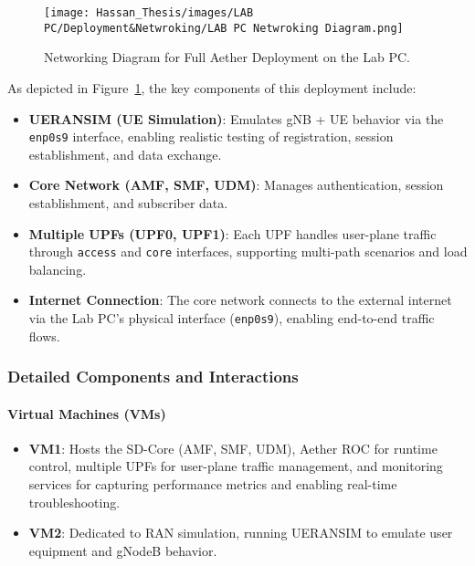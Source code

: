 \begin{figure}[!htb]
    \centering
    \texttt{[image: Hassan\_Thesis/images/LAB PC/Deployment\&Netwroking/LAB PC Netwroking Diagram.png]}
    \caption{Networking Diagram for Full Aether Deployment on the Lab PC.}
    \label{fig:lab-pc-network}
\end{figure}

As depicted in Figure~\ref{fig:lab-pc-network}, the key components of this deployment include:
\begin{itemize}
    \item \textbf{UERANSIM (UE Simulation)}: Emulates gNB + UE behavior via the \texttt{enp0s9} interface, enabling realistic testing of registration, session establishment, and data exchange.
    \item \textbf{Core Network (AMF, SMF, UDM)}: Manages authentication, session establishment, and subscriber data.
    \item \textbf{Multiple UPFs (UPF0, UPF1)}: Each UPF handles user-plane traffic through \texttt{access} and \texttt{core} interfaces, supporting multi-path scenarios and load balancing.
    \item \textbf{Internet Connection}: The core network connects to the external internet via the Lab PC’s physical interface (\texttt{enp0s9}), enabling end-to-end traffic flows.
\end{itemize}

\subsubsection{Detailed Components and Interactions}
\label{subsubsec:labpc-components}

\paragraph{Virtual Machines (VMs)}
\begin{itemize}
    \item \textbf{VM1}: Hosts the SD-Core (AMF, SMF, UDM), Aether ROC for runtime control, multiple UPFs for user-plane traffic management, and monitoring services for capturing performance metrics and enabling real-time troubleshooting.
    \item \textbf{VM2}: Dedicated to RAN simulation, running UERANSIM to emulate user equipment and gNodeB behavior.
\end{itemize}

